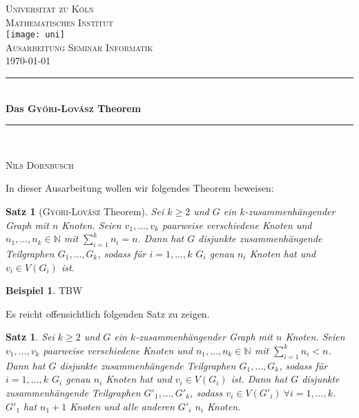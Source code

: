 \documentclass[12pt,a4paper]{scrartcl}
\numberwithin{equation}{section} %
\theoremstyle{definition}
\newtheorem{bsp}[auf]{Beispiel}
\theoremstyle{plain}
\newtheorem{sa}[auf]{Satz}
\newcommand{\nn}{\mathbb{N}}
\begin{document}
\begin{titlepage}
\pagestyle{empty}
\begin{center}

\textsc{\LARGE Universität zu Köln }\\ [0.4cm]
\textsc{ Mathematisches Institut} \\[1.5cm]

\texttt{[image: uni]}\\[1.5cm]  %

\textsc{\Large Ausarbeitung Seminar Informatik}\\[2mm]
\textsc{\today}\\[10mm]
  

\newcommand{\HRule}{\rule{\linewidth}{0.7mm}}
\HRule \\[0.4cm]
{ \huge \bfseries Das \textsc{Györi-Lovász} Theorem}\\[0.4cm]

\HRule \\[3cm]

\begin{center}

\textsc{\Large Nils Dornbusch} \\[3pt]
\end{center}
\end{center}
\end{titlepage}
\newpage
In dieser Ausarbeitung wollen wir folgendes Theorem beweisen:
\begin{sa}[\textsc{Györi-Lovász} Theorem]
Sei $k\ge 2$ und $G$ ein $k$-zusammenhängender Graph mit $n$ Knoten. Seien $v_1,\dotsc,v_k$ paarweise verschiedene Knoten und $n_1,\dotsc,n_k\in\nn$ mit $\sum_{i=1}^kn_i=n$. Dann hat $G$ disjunkte zusammenhängende Teilgraphen $G_1,\dotsc,G_k$, sodass für $i=1,\dotsc,k$ $G_i$ genau $n_i$ Knoten hat und $v_i\in V(G_i)$ ist.
\end{sa}
\begin{bsp}
TBW
\end{bsp}
Es reicht offensichtlich folgenden Satz zu zeigen.
\begin{sa}
Sei $k\ge 2$ und $G$ ein $k$-zusammenhängender Graph mit $n$ Knoten. Seien $v_1,\dotsc,v_k$ paarweise verschiedene Knoten und $n_1,\dotsc,n_k\in\nn$ mit $\sum_{i=1}^kn_i<n$. Dann hat $G$ disjunkte zusammenhängende Teilgraphen $G_1,\dotsc,G_k$, sodass für $i=1,\dotsc,k$ $G_i$ genau $n_i$ Knoten hat und $v_i\in V(G_i)$ ist. Dann hat $G$ disjunkte zusammenhängende Teilgraphen $G'_1,\dotsc,G'_k$, sodass $v_i\in V(G'_i)~\forall i=1,\dotsc,k$. $G'_1$ hat $n_1+1$ Knoten und alle anderen $G'_i$ $n_i$ Knoten.
\label{sa:2}
\end{sa}
\end{document}
